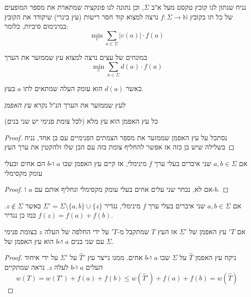 נניח שנתון לנו קובץ טקסט מעל א"ב
$\Sigma$,
וכן נתונה לנו פונקציה שמתארת את מספר המופעים של כל תו בקובץ
$f:\Sigma \to \mathbb{N}$
נרצה למצוא קוד חסר רישות (עץ בינרי) שיקודד את הקובץ במינימום סיביות, כלומר:
$$
\min_c \sum_{a \in \Sigma}|c(a)| \cdot f(a)
$$

במונחים של עצים נרצה למצוא עץ שממזער את הערך
$$
\min_c \sum_{a \in \Sigma}d(a) \cdot f(a)
$$

כאשר 
$d(a)$
הוא עומק העלה שמתאים לתו $a$ בעץ.

לעץ שממזער את הערך הנ"ל נקרא 
\emph{עץ האפמן}

\begin{claim}
כל עץ האפמן הוא עץ מלא (לכל צומת פנימי יש שני בנים)
\end{claim}

\begin{proof}
נסתכל על עץ האפמן שממזער את מספר הצמתים הפנימיים עם בן אחד,
נניח בשלילה שיש בן כזה
אז אפשר להחליף צומת כזה עם הבן שלו ולהקטין את ערך העץ
\end{proof}

\begin{claim}
אם 
$a,b \in \Sigma$
שני איברים בעלי ערך 
$f$
מינימלי, 
אז קיים עץ האפמן שבו $a$ ו-$b$ הם אחים ובעלי עומק מקסימלי
\end{claim}

\begin{proof}
אם לא, נבחר שני עלים אחים בעלי עומק מקסימלי ונחליף אותם עם $a$ ו-$b$.
\end{proof}

\begin{lemma}
אם 
$a,b \in \Sigma$
שני איברים בעלי ערך 
$f$
מינימלי, 
נגדיר 
$\Sigma' = \Sigma \setminus \{a,b\} \cup \{z\}$
כאשר
$z \notin \Sigma$.
כמו כן נגדיר
$f(z) = f(a) + f(b)$.

אם $'T$ עץ האפמן של 
$\Sigma'$
אז העץ $T$ שמתקבל מ-$'T$ על ידי החלפה של העלה $z$ בצומת פנימי עם שני בנים $a$ ו-$b$ הוא עץ
האפמן של 
$\Sigma$.
\end{lemma}

\begin{proof}
ניקח עץ האפמן
$\hat{T}$
על 
$\Sigma$
שבו $a$ ו-$b$ אחים.
ממנו נייצר עץ 
$\hat{T}'$
על 
$\Sigma'$
על ידי איחוד העלים $a$ ו-$b$ לעלה $z$.
נראה שמתקיים 
$$
w(T) = w(T') + f(a) + f(b) \leq w(\hat{T}') + f(a) + f(b) = w(\hat{T})
$$

\end{proof}
